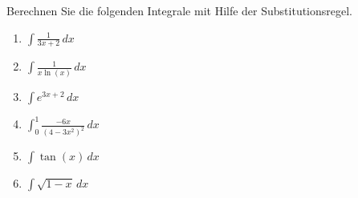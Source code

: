 \begin{ExerciseBlock}
Berechnen Sie die folgenden Integrale mit Hilfe der Substitutionsregel.
\begin{enumerate}[label=\alph*)]
	\item $\int \frac{1}{3x+2} \, dx$
	\item $\int \frac{1}{x \ln(x)} \, dx$
	\item $\int e^{3x+2} \, dx$  
	\item $\int_{0}^{1} \frac{-6x}{(4-3x^2)^2} \, dx$
	\item $\int \tan(x) \, dx$
	\item $\int \sqrt{1-x} \, dx$
\end{enumerate}

\end{ExerciseBlock}
